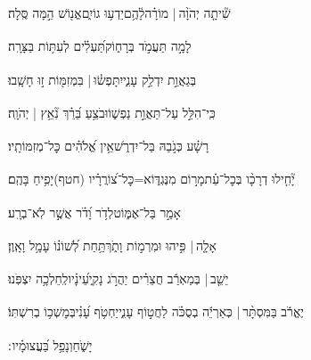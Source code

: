\documentclass[12pt]{article}
\newcommand{\loc}[1]{\textsuperscript{\locf{#1}}}
\begin{document}
{\loc{ כא}~}‏שִׁ֘יתָ֤ה יְהֹוָ֨ה |  מוֹרָ֗ה{\hfill}לָ֫הֶ֥ם\newline\hspace*{.5em}יֵדְע֥וּ גוֹיִ֑ם{\hfill}אֱנ֖וֹשׁ הֵ֣מָּה סֶּֽלָה׃\par\pend
\ledpb
\pstart[\subsection*{\textcolor{red}{פרק י}}]\label{פרק י}
{\loc{ א}~}‏לָמָ֣ה  תַּעֲמֹ֣ד בְּרָח֑וֹק{\hfill}תַּ֝עְלִ֗ים לְעִתּ֥וֹת בַּצָּרָֽה׃\par

{\loc{ ב}~}‏בְּגַאֲוַ֣ת  יִדְלַ֣ק עָנִ֑י{\hfill}יִתָּפְשׂ֓וּ |  בִּמְזִמּ֖וֹת ז֣וּ חָשָֽׁבוּ׃\par

{\loc{ ג}~}‏כִּֽי־הִלֵּ֣ל  עַל־תַּאֲוַ֣ת נַפְשׁ֑וֹ{\hfill}וּבֹצֵ֥עַ בֵּ֝רֵ֗ךְ נִ֘אֵ֥ץ | יְהֹוָֽה׃\par

{\loc{ ד}~}‏רָשָׁ֗ע כְּגֹ֣בַהּ  בַּל־יִדְרֹ֑שׁ{\hfill}אֵ֥ין אֱ֝לֹהִ֗ים כׇּל־מְזִמּוֹתָֽיו׃\par

{\loc{ ה}~}‏יָ֘חִ֤ילוּ דְרָכָ֨ו בְּכׇל־עֵ֗ת{\hfill}מָר֣וֹם  מִנֶּגְדּ֑וֹ\newline\hspace*{.5em}א=כׇּל־צ֝וֹרֲרָ֗יו (חטף){\hfill}יָפִ֥יחַ בָּהֶֽם׃\par

{\loc{ ו}~}‏אָמַ֣ר  בַּל־אֶמּ֑וֹט{\hfill}לְדֹ֥ר וָ֝דֹ֗ר אֲשֶׁ֣ר לֹֽא־בְרָֽע׃\par

{\loc{ ז}~}‏אָלָ֤ה |  פִּ֣יהוּ  וּמִרְמ֣וֹת וָתֹ֑ךְ{\hfill}תַּ֥חַת לְ֝שׁוֹנ֗וֹ עָמָ֥ל וָאָֽוֶן׃\par

{\loc{ ח}~}‏יֵשֵׁ֤ב |  בְּמַאְרַ֬ב חֲצֵרִ֗ים{\hfill} יַהֲרֹ֣ג נָקִ֑י\newline\hspace*{.5em}עֵ֝ינָ֗יו{\hfill}לְֽחֵלְכָ֥ה יִצְפֹּֽנוּ׃\par

{\loc{ ט}~}‏יֶאֱרֹ֬ב בַּמִּסְתָּ֨ר |  כְּאַרְיֵ֬ה בְסֻכֹּ֗ה{\hfill} לַחֲט֣וֹף עָנִ֑י\newline\hspace*{.5em}יַחְטֹ֥ף עָ֝נִ֗י{\hfill}בְּמׇשְׁכ֥וֹ בְרִשְׁתּֽוֹ׃\par

{\loc{ י}~}‏ יָשֹׁ֑חַ{\hfill}וְנָפַ֥ל בַּ֝עֲצוּמָ֗יו ׃\par
\end{document}

